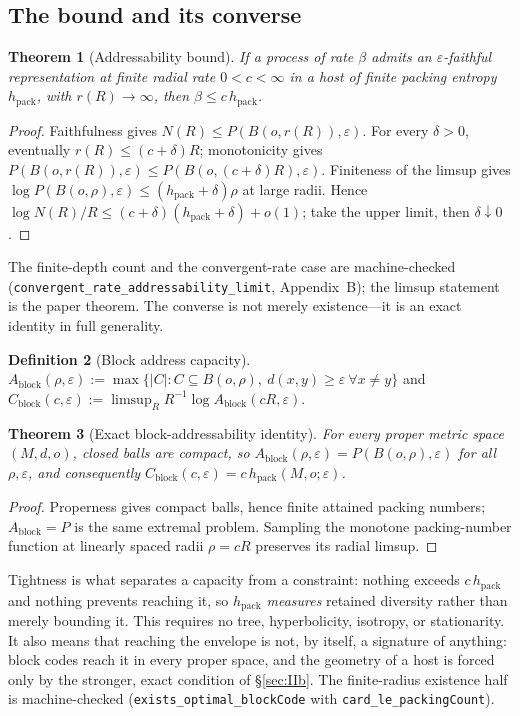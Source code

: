 \documentclass[11pt,reqno]{amsart}
\theoremstyle{plain}
\newtheorem{theorem}{Theorem}[section]
\theoremstyle{definition}
\newtheorem{definition}[theorem]{Definition}
\newcommand{\hpack}{h_{\mathrm{pack}}}
\newcommand{\Cblock}{C_{\mathrm{block}}}
\newcommand{\eps}{\varepsilon}
\begin{document}
\subsection{The bound and its converse}

\begin{theorem}[Addressability bound]\label{thm:bound}
If a process of rate $\beta$ admits an $\eps$-faithful representation at finite radial rate $0<c<\infty$ in a host of finite packing entropy $\hpack$, with $r(R)\to\infty$, then $\beta\le c\,\hpack$.
\end{theorem}

\begin{proof}
Faithfulness gives $N(R)\le P(B(o,r(R)),\eps)$. For every $\delta>0$, eventually $r(R)\le(c+\delta)R$; monotonicity gives $P(B(o,r(R)),\eps)\le P(B(o,(c+\delta)R),\eps)$. Finiteness of the limsup gives $\log P(B(o,\rho),\eps)\le(\hpack+\delta)\rho$ at large radii. Hence $\log N(R)/R\le(c+\delta)(\hpack+\delta)+o(1)$; take the upper limit, then $\delta\downarrow0$.
\end{proof}

The finite-depth count and the convergent-rate case are machine-checked (\texttt{convergent\_rate\_addressability\_limit}, Appendix~B); the limsup statement is the paper theorem. The converse is not merely existence---it is an exact identity in full generality.

\begin{definition}[Block address capacity]
$A_{\mathrm{block}}(\rho,\eps):=\max\{|C|:C\subseteq B(o,\rho),\ d(x,y)\ge\eps\ \forall x\ne y\}$ and $\Cblock(c,\eps):=\limsup_R R^{-1}\log A_{\mathrm{block}}(cR,\eps)$.
\end{definition}

\begin{theorem}[Exact block-addressability identity]\label{thm:block}
For every proper metric space $(M,d,o)$, closed balls are compact, so $A_{\mathrm{block}}(\rho,\eps)=P(B(o,\rho),\eps)$ for all $\rho,\eps$, and consequently $\Cblock(c,\eps)=c\,\hpack(M,o;\eps)$.
\end{theorem}

\begin{proof}
Properness gives compact balls, hence finite attained packing numbers; $A_{\mathrm{block}}=P$ is the same extremal problem. Sampling the monotone packing-number function at linearly spaced radii $\rho=cR$ preserves its radial limsup.
\end{proof}

Tightness is what separates a capacity from a constraint: nothing exceeds $c\,\hpack$ and nothing prevents reaching it, so $\hpack$ \emph{measures} retained diversity rather than merely bounding it. This requires no tree, hyperbolicity, isotropy, or stationarity. It also means that reaching the envelope is not, by itself, a signature of anything: block codes reach it in every proper space, and the geometry of a host is forced only by the stronger, exact condition of \S\ref{sec:IIb}. The finite-radius existence half is machine-checked (\texttt{exists\_optimal\_blockCode} with \texttt{card\_le\_packingCount}).
\end{document}
